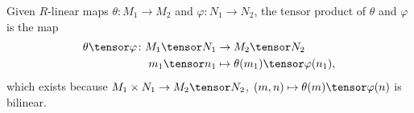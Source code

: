Given $R$-linear maps $\theta\colon M_1\to M_2$ and $\varphi\colon N_1\to N_2$,
the tensor product of $\theta$ and $\varphi$ is the map
\begin{align*}
	\theta\tensor\varphi\colon M_1\tensor N_1 &\to M_2\tensor N_2\\
	m_1\tensor n_1 &\mapsto \theta(m_1)\tensor \varphi(n_1),
\end{align*}
which exists because $M_1\times N_1\to M_2\tensor N_2$, $(m, n)\mapsto \theta(m)\tensor \varphi(n)$
is bilinear.

